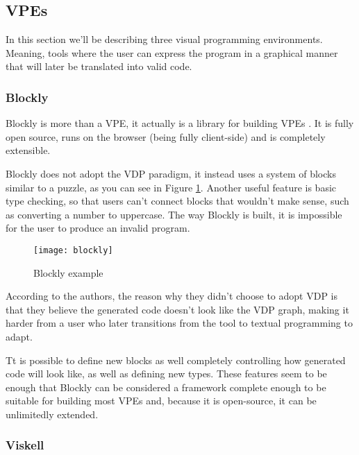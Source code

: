\begin{itemsize}
\subsection{VPEs}

In this section we'll be describing three visual programming environments. Meaning,
tools where the user can express the program in a graphical manner that will
later be translated into valid code.

\subsubsection{Blockly}

Blockly is more than a VPE, it actually is a library for building VPEs \cite{blockly}.
It is fully open source, runs on the browser (being fully client-side) and is completely extensible.

Blockly does not adopt the VDP paradigm, it instead uses a system of blocks
similar to a puzzle, as you can see in Figure \ref{fig:blockly}.
Another useful feature is basic type checking,
so that users can't connect blocks that wouldn't make sense, such as converting
a number to uppercase. The way Blockly is built, it is impossible for the user
to produce an invalid program.

\begin{figure}[t]
  \begin{center}
    \leavevmode
    \texttt{[image: blockly]}
    \caption{Blockly example \cite{blockly}}
    \label{fig:blockly}
  \end{center}
\end{figure}

According to the authors, the reason why they didn't choose to adopt VDP is that
they believe the generated code doesn't look like the VDP graph, making it harder
from a user who later transitions from the tool to textual programming to adapt.

Tt is possible to define new blocks as well completely controlling
how generated code will look like, as well as defining new types. These features
seem to be enough that Blockly can be considered a framework complete enough to
be suitable for building most VPEs and, because it is open-source, it can be
unlimitedly extended.

\subsubsection{Viskell}
\label{sec:viskell}


\end{itemsize}

